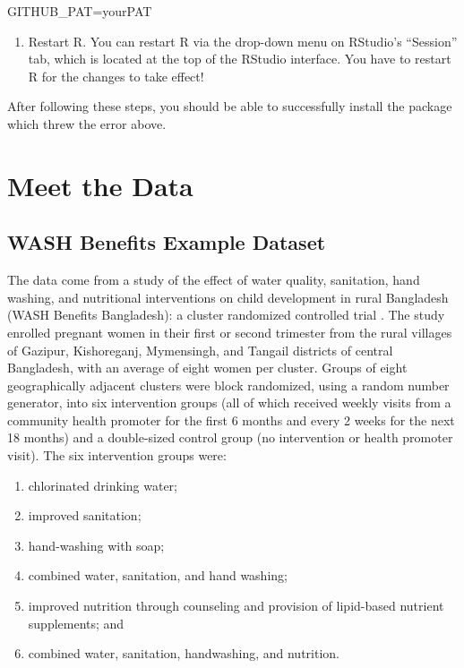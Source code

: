 \documentclass[12pt, krantz2,]{krantz}
\newenvironment{Shaded}{\begin{snugshade}}{\end{snugshade}}
\newcommand{\NormalTok}[1]{#1}
\providecommand{\tightlist}{%
  \setlength{\itemsep}{0pt}\setlength{\parskip}{0pt}}
\theoremstyle{definition}
\theoremstyle{definition}
\theoremstyle{definition}
\newcommand{\1}{\mathbbm{1}}
\begin{document}
\begin{Shaded}
\begin{Highlighting}[]
\NormalTok{GITHUB_PAT=yourPAT}
\end{Highlighting}
\end{Shaded}

\begin{enumerate}
\def\labelenumi{\arabic{enumi}.}
\setcounter{enumi}{7}
\tightlist
\item
  Restart R. You can restart R via the drop-down menu on RStudio's ``Session''
  tab, which is located at the top of the RStudio interface. You have to
  restart R for the changes to take effect!
\end{enumerate}

After following these steps, you should be able to successfully install the
package which threw the error above.

\hypertarget{data}{%
\section{Meet the Data}\label{data}}

\hypertarget{wash}{%
\subsection{WASH Benefits Example Dataset}\label{wash}}

The data come from a study of the effect of water quality, sanitation, hand
washing, and nutritional interventions on child development in rural Bangladesh
(WASH Benefits Bangladesh): a cluster randomized controlled trial
\citep{luby2018effect}. The study enrolled pregnant women in their first or second
trimester from the rural villages of Gazipur, Kishoreganj, Mymensingh, and
Tangail districts of central Bangladesh, with an average of eight women per
cluster. Groups of eight geographically adjacent clusters were block randomized,
using a random number generator, into six intervention groups (all of which
received weekly visits from a community health promoter for the first 6 months
and every 2 weeks for the next 18 months) and a double-sized control group (no
intervention or health promoter visit). The six intervention groups were:

\begin{enumerate}
\def\labelenumi{\arabic{enumi}.}
\tightlist
\item
  chlorinated drinking water;
\item
  improved sanitation;
\item
  hand-washing with soap;
\item
  combined water, sanitation, and hand washing;
\item
  improved nutrition through counseling and provision of lipid-based nutrient
  supplements; and
\item
  combined water, sanitation, handwashing, and nutrition.
\end{enumerate}
\end{document}
